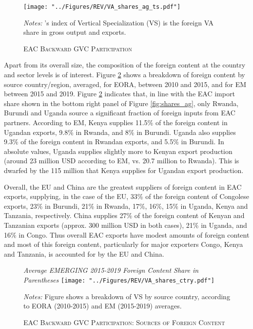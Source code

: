 \documentclass[a4paper]{article}
\begin{document}
\begin{figure}[h!]
\centering
\caption{\label{fig:EACVB_ag_ts}\textsc{EAC Backward GVC Participation}}
\texttt{[image: "../Figures/REV/VA\_shares\_ag\_ts.pdf"]} %
\raggedright
\scriptsize
\emph{Notes:} \citet{hummels2001nature}'s index of Vertical Specialization (VS) is the foreign VA share in gross output and exports. 
\end{figure}
\FloatBarrier

Apart from its overall size, the composition of the foreign content at the country and sector levels is of interest. Figure \ref{fig:EACVB_ctry} shows a breakdown of foreign content by source country/region, averaged, for EORA, between 2010 and 2015, and for EM between 2015 and 2019. Figure \ref{fig:EACVB_ctry} indicates that, in line with the EAC import share shown in the bottom right panel of Figure \ref{fig:shares_ag}, only Rwanda, Burundi and Uganda source a significant fraction of foreign inputs from EAC partners. According to EM, Kenya supplies 11.5\% of the foreign content in Ugandan exports, 9.8\% in Rwanda, and 8\% in Burundi. Uganda also supplies 9.3\% of the foreign content in Rwandan exports, and 5.5\% in Burundi. In absolute values, Uganda supplies slightly more to Kenyan export production (around 23 million USD according to EM, vs. 20.7 million to Rwanda). This is dwarfed by the 115 million that Kenya supplies for Ugandan export production. \newline 

Overall, the EU and China are the greatest suppliers of foreign content in EAC exports, supplying, in the case of the EU, 33\% of the foreign content of Congolese exports, 23\% in Burundi, 21\% in Rwanda, 17\%, 16\%, 15\% in Uganda, Kenya and Tanzania, respectively. China supplies 27\% of the foreign content of Kenyan and Tanzanian exports (approx. 300 million USD in both cases), 21\% in Uganda, and 16\% in Congo. Thus overall EAC exports have modest amounts of foreign content and most of this foreign content, particularly for major exporters Congo, Kenya and Tanzania, is accounted for by the EU and China. 

\begin{figure}[h!]
\centering
\caption{\label{fig:EACVB_ctry}\textsc{EAC Backward GVC Participation: Sources of Foreign Content}}
\small{\textit{Average EMERGING 2015-2019 Foreign Content Share in Parentheses}}
\vspace{2mm}
\texttt{[image: "../Figures/REV/VA\_shares\_ctry.pdf"]} \\ %
\raggedright
\scriptsize
\vspace{-2mm}
\emph{Notes:} Figure shows a breakdown of VS by source country, according to EORA (2010-2015) and EM (2015-2019) averages. \\ \vspace{-2mm}
\end{figure}
\FloatBarrier
\end{document}
